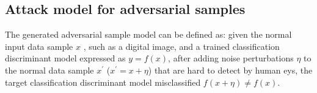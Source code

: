 \documentclass{ieeeaccess}
\begin{document}


\subsection{Attack model for adversarial samples}
The generated adversarial sample model \cite{szegedy2013intriguing} can be defined as: given the normal input data sample $x$ , such as a digital image, and a trained classification discriminant model expressed as $y = f(x)$, after adding noise perturbations $\eta$ to the normal data sample $x^{\prime}$ ($x^{\prime} = x+\eta$) that are hard to detect by human eys, the target classification discriminant model misclassified $f(x+\eta) \neq f(x)$.
\end{document}

